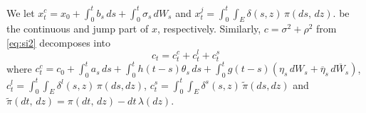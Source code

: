 \documentclass[ecta,nameyear,draft]{econsocart}
\def\wt{\widetilde}
\newcommand{\1}{\mathbf 1}
\newcommand{\jump}{\delta}
\numberwithin{equation}{section}
\newcommand{\ov}{\overline}
\begin{document}
\begin{appendix}
We let
$
		x^{c}_t
		=
		x_0 + \int_0^t b_{s} \, ds +\int_0^t\sigma_{s}\, dW_{s}$
and $
		x^{j}_t 
		=
		\int_0^t \int_E \jump(s,z) \, \pi(ds, \, dz).
$
be the continuous and jump part of $x$, respectively. Similarly, $c = \sigma^2 + \rho^2$ from \eqref{eq:si2} decomposes into
\begin{equation} 
	\label{eq:si} 
	c_t = c^c_t + c^l_t + c^s_t
\end{equation}
where
$
		c^c_t = c_0 +\int_0^t a_s \, ds+   \int_0^t h(t-s) \theta_s \, ds + \int_0^t g(t-s)(\eta_s\,dW_s+\ov \eta_s\, d\ov W_s)$, 
$
		c^l_t = \int_0^t \int_E \jump^{l}(s,z)\,\pi(ds, dz)$, $
		c^s_t =  \int_0^t \int_E \jump^{s}(s,z) \,\wt \pi(ds, dz)$ and
$\wt \pi (dt, \, dz)= \pi(dt,\,dz) - dt \, \lambda(dz)$.


\end{appendix}
\end{document}
